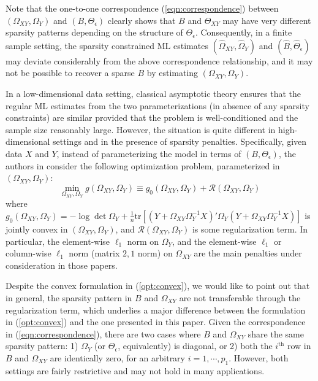 Note that the one-to-one correspondence (\ref{eqn:correspondence}) between $(\Omega_{XY},\Omega_Y)$ and $(B,\Theta_\epsilon)$ clearly shows that $B$ and $\Theta_{XY}$ may have very different sparsity patterns depending on the structure of $\Theta_{\epsilon}$. Consequently, in a finite sample setting, the sparsity constrained ML estimates $(\hat{\Omega}_{XY}, \hat{\Omega}_Y)$ and $(\hat{B}, \hat{\Theta}_{\epsilon})$ may deviate considerably from the above correspondence relationship, and it may not be possible to recover a sparse $B$ by estimating $(\Omega_{XY},\Omega_Y)$. 
 
In a low-dimensional data setting, classical asymptotic theory ensures that the regular ML estimates from the two parameterizations (in absence of any sparsity constraints) are similar provided that the problem is well-conditioned and the sample size reasonably large. However, the situation is quite different in high-dimensional settings and in the presence of sparsity penalties. Specifically, given data $X$ and $Y$, instead of parameterizing the model in terms of $(B,\Theta_\epsilon)$, the authors in \cite{sohn2012joint,yuan2014partial,mccarter2014sparse} consider the following optimization problem, parameterized in $(\Omega_{XY},\Omega_Y)$:
\begin{equation}\label{opt:convex}
\min\limits_{\Omega_{XY},\Omega_Y} g(\Omega_{XY},\Omega_Y) \equiv  g_0(\Omega_{XY},\Omega_Y)
+ \mathcal{R}(\Omega_{XY},\Omega_{Y})
\end{equation}
where $g_0(\Omega_{XY},\Omega_Y) = -\log\det\Omega_Y + \frac{1}{n}\text{tr}\left[ (Y + \Omega_{XY}\Omega_{Y}^{-1} X)'\Omega_Y (Y + \Omega_{XY}\Omega_{Y}^{-1}X) \right]$ is jointly convex in $(\Omega_{XY},\Omega_Y)$, and $\mathcal{R}(\Omega_{XY},\Omega_Y)$ is some regularization term. In particular, the element-wise $\ell_1$ norm on $\Omega_Y$, and the element-wise $\ell_1$ or column-wise $\ell_1$ norm (matrix $2,1$ norm) on $\Omega_{XY}$ are the main penalties under consideration in those papers. 

Despite the convex formulation in (\ref{opt:convex}), we would like to point out that in general, the sparsity pattern in $B$ and $\Omega_{XY}$ are not transferable through the regularization term, which underlies a major difference between the formulation in (\ref{opt:convex}) and the one presented in this paper. Given the correspondence in (\ref{eqn:correspondence}), there are two cases where $B$ and $\Omega_{XY}$ share the same sparsity pattern: 1) $\Omega_{Y}$ (or $\Theta_{\epsilon}$, equivalently) is diagonal, or 2) both the $i^{\text{th}}$ row in $B$ and $\Omega_{XY}$ are identically zero, for an arbitrary $i=1,\cdots,p_1$.  However, both settings are fairly restrictive and may not hold in many applications. 

